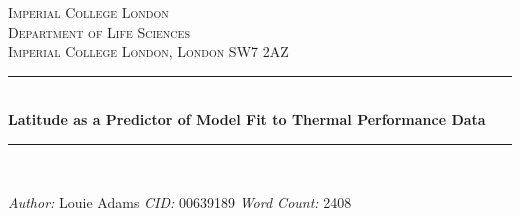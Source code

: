 \documentclass[a4paper, 11pt]{article}
\begin{document}
\begin{titlepage}


\newcommand{\HRule}{\rule{\linewidth}{0.5mm}} %

\center %
 

\textsc{\LARGE Imperial College London}\\[1.5cm] %
\textsc{\Large Department of Life Sciences}\\[0.5cm] %
\textsc{\large Imperial College London, London SW7 2AZ}\\[0.5cm] %


\HRule \\[0.6cm]
\doublespacing
{ \huge \bfseries Latitude as a Predictor of Model Fit to Thermal Performance Data}\\[0.2cm] %
\HRule \\[1.5cm]
 

\begin{minipage}{0.4\textwidth}
\large
\emph{Author:} Louie Adams \newline
\emph{CID:} 00639189 \newline
\emph{Word Count:} 2408
\end{minipage}
~

\vfill %
\end{titlepage}
\end{document}

